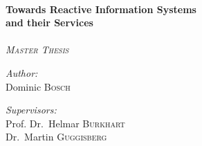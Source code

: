 \begin{titlepage}
\begin{center}


\vspace*{4cm}
\HRule \\[0.4cm]
{ \huge \bfseries Towards Reactive Information Systems \\ and their Services \\[0.4cm] }
\HRule \\[1.5cm]


\vspace*{.5cm}
\textit{\textsc{\LARGE Master Thesis}}\\
\vspace*{2.5cm}

\begin{minipage}{0.4\textwidth}
\begin{flushleft} \large
\emph{Author:}\\
Dominic \textsc{Bosch}
\end{flushleft}
\end{minipage}
\begin{minipage}{0.4\textwidth}
\begin{flushright} \large
\emph{Supervisors:} \\
Prof. Dr.~Helmar \textsc{Burkhart}\\
Dr.~Martin \textsc{Guggisberg}
\end{flushright}
\end{minipage}


\end{center}
\end{titlepage}
